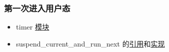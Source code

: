 \begin{frame}
	\frametitle{第一次进入用户态}
% 
\begin{itemize}
	\item timer \href{https://github.com/rcore-os/rCore-Tutorial-v3/blob/ch3/os/src/timer.rs\#L12}{模块}
	\item suspend\_current\_and\_run\_next 的\href{https://github.com/rcore-os/rCore-Tutorial-v3/blob/ch3/os/src/trap/mod.rs\#L53}{引用}和\href{https://github.com/rcore-os/rCore-Tutorial-v3/blob/ch3/os/src/task/mod.rs\#L119}{实现}	
\end{itemize}
\end{frame}

